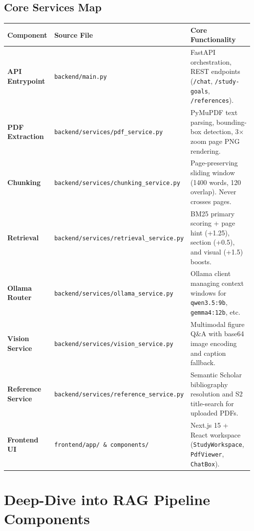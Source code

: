 \documentclass[10pt,a4paper]{article}
\begin{document}
\subsection{Core Services Map}

\begin{table}[h!]
\centering
\small
\begin{tabularx}{\textwidth}{l p{5.5cm} X}
\toprule
\textbf{Component} & \textbf{Source File} & \textbf{Core Functionality} \\
\midrule
\textbf{API Entrypoint} & \texttt{backend/main.py} & FastAPI orchestration, REST endpoints (\texttt{/chat}, \texttt{/study-goals}, \texttt{/references}). \\
\textbf{PDF Extraction} & \texttt{backend/services/pdf\_service.py} & PyMuPDF text parsing, bounding-box detection, 3$\times$ zoom page PNG rendering. \\
\textbf{Chunking} & \texttt{backend/services/chunking\_service.py} & Page-preserving sliding window (1400 words, 120 overlap). Never crosses pages. \\
\textbf{Retrieval} & \texttt{backend/services/retrieval\_service.py} & BM25 primary scoring + page hint (+1.25), section (+0.5), and visual (+1.5) boosts. \\
\textbf{Ollama Router} & \texttt{backend/services/ollama\_service.py} & Ollama client managing context windows for \texttt{qwen3.5:9b}, \texttt{gemma4:12b}, etc. \\
\textbf{Vision Service} & \texttt{backend/services/vision\_service.py} & Multimodal figure Q\&A with base64 image encoding and caption fallback. \\
\textbf{Reference Service} & \texttt{backend/services/reference\_service.py} & Semantic Scholar bibliography resolution and S2 title-search for uploaded PDFs. \\
\textbf{Frontend UI} & \texttt{frontend/app/ \& components/} & Next.js 15 + React workspace (\texttt{StudyWorkspace}, \texttt{PdfViewer}, \texttt{ChatBox}). \\
\bottomrule
\end{tabularx}
\end{table}

\newpage

\section{Deep-Dive into RAG Pipeline Components}
\end{document}
